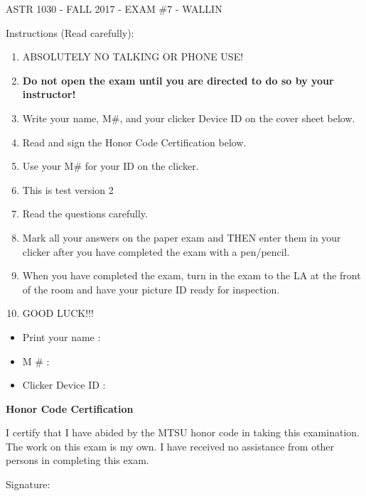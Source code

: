 \documentclass[11pt]{article}
\begin{document}
\pagebreak 
\setcounter{page}{1}
\vskip 0.1in 

\begin{center}ASTR 1030 - FALL 2017 - EXAM \#7 - WALLIN
\vskip 0.1in 

\end{center}
Instructions (Read carefully): 
\begin{enumerate}
\item ABSOLUTELY NO TALKING OR PHONE USE! 
\item {\bf Do not open the exam until you are directed to do so by your instructor!}
\item Write your name, M\#, and your clicker Device ID on the cover sheet below. 
\item Read and sign the Honor Code Certification below.
\item Use your M\# for your ID on the clicker.
\item This is test version 2
\item Read the questions carefully. 
\item Mark all your answers on the paper exam and THEN enter them in your clicker after you have completed the exam with a pen/pencil.
\item When you have completed the exam, turn in the exam to the LA at the front of the room and have your picture ID ready for inspection.
\item GOOD LUCK!!! 
\end{enumerate}
\hrulefill 
\vskip 0.1in 

\begin{itemize} \item Print your name :
\vskip 0.25in 


\item M \# :
\vskip 0.25in 

\item Clicker Device ID : 
\end{itemize} 
\vskip 0.5in 

{\bf Honor Code Certification}
\bigskip

I certify that I have abided by the MTSU honor code in taking this examination. The work
on this exam is my own. I have received no assistance from other persons in completing
this exam. 
\bigskip

Signature:


\pagebreak 
\end{document}
